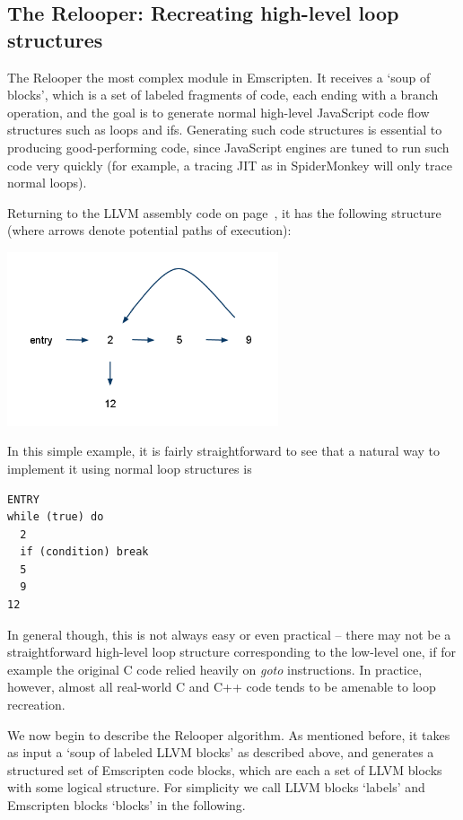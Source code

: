 \documentclass[preprint,10pt]{sigplanconf}
\begin{document}
\subsection{The Relooper: Recreating high-level loop structures}
\label{sec:relooper}

The Relooper the most complex module in Emscripten. It receives
a `soup of blocks', which is a set of labeled fragments of code, each
ending with a branch operation, and the goal is to generate normal
high-level JavaScript code flow structures such as loops and ifs.
Generating such code structures is essential to producing good-performing code,
since JavaScript engines are tuned to run such code very quickly (for
example, a tracing JIT as in SpiderMonkey will only trace normal loops).

Returning to the LLVM assembly code on page~\pageref{code:examplellvm}, it
has the following structure (where arrows denote potential paths of execution):

\includegraphics[width=80mm]{graph.png}

In this simple example, it is fairly straightforward to see that a natural way to implement it
using normal loop structures is
\newpage
\begin{verbatim}
ENTRY
while (true) do
  2
  if (condition) break
  5
  9
12
\end{verbatim}
In general though, this is not always easy or even practical -- there may
not be a straightforward high-level loop structure corresponding to the low-level one, if
for example the original C code relied heavily on \emph{goto} instructions.
In practice, however, almost all real-world C and C++ code tends to
be amenable to loop recreation.

We now begin to describe the Relooper algorithm. As mentioned before, it takes as input a `soup of labeled LLVM blocks' as described above,
and generates a structured set of Emscripten code blocks, which are each a set of LLVM blocks
with some logical structure. For simplicity we call LLVM blocks `labels' and Emscripten
blocks `blocks' in the following.
\end{document}
